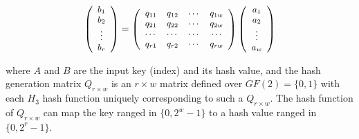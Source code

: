 \documentclass[10pt,journal,letterpaper]{IEEEtran}
\begin{document}
\begin{equation}
\footnotesize
\left( {\begin{array}{*{20}{c}}
   {{b_1}}  \\
   {{b_2}}  \\
    \vdots   \\
   {{b_r}}  \\
\end{array}} \right) = \left( {\begin{array}{*{20}{c}}
   {{q_{11}}} & {{q_{12}}} &  \cdots  & {{q_{1w}}}  \\
   {{q_{21}}} & {{q_{22}}} &  \cdots  & {{q_{2w}}}  \\
    \cdots  &  \cdots  &  \cdots  &  \cdots   \\
   {{q_{r1}}} & {{q_{r2}}} &  \cdots  & {{q_{rw}}}  \\
\end{array}} \right)\left( {\begin{array}{*{20}{c}}
   {{a_1}}  \\
   {{a_2}}  \\
    \vdots   \\
   {{a_w}}  \\
\end{array}} \right)
\label{eq:h3hash}
\end{equation}

\noindent where $A$ and $B$ are the input key (index) and its hash value, and the hash generation matrix ${Q_{r \times w}}$ is an $r \times w$ matrix defined over $GF(2)=\{0,1\}$ with each $H_3$ hash function uniquely corresponding to such a ${Q_{r \times w}}$. The hash function of ${Q_{r \times w}}$ can map the key ranged in $\{0,{2^w} - 1\}$ to a hash value ranged in $\{0,{2^r} - 1\}$.
\end{document}
